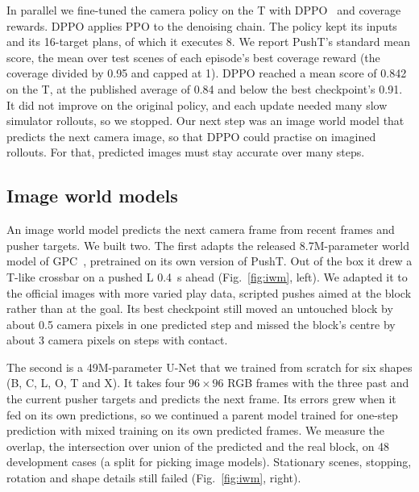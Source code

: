 \documentclass[10pt,twocolumn,letterpaper]{article}
\begin{document}
In parallel we fine-tuned the camera policy on the T with DPPO~\citep{ren2025dppo} and coverage rewards. DPPO applies
PPO to the denoising chain. The policy kept its inputs and its 16-target plans, of which it executes 8. We report
PushT's standard mean score, the mean over test scenes of each episode's best coverage reward (the coverage divided by
0.95 and capped at 1). DPPO reached a mean score of 0.842 on the T, at the published average of 0.84 and below the
best checkpoint's 0.91. It did not improve on the original policy, and each update needed many slow simulator rollouts,
so we stopped. Our next step was an image world model that predicts the next camera image, so that DPPO could practise
on imagined rollouts. For that, predicted images must stay accurate over many steps.

\subsection{Image world models}
\label{sec:iwm}

An image world model predicts the next camera frame from recent frames and pusher targets. We built two. The first
adapts the released 8.7M-parameter world model of GPC~\citep{qi2025gpc}, pretrained on its own version of PushT. Out
of the box it drew a T-like crossbar on a pushed L 0.4~s ahead (Fig.~\ref{fig:iwm}, left). We adapted it to the
official images with more varied play data, scripted pushes aimed at the block rather than at the goal. Its best
checkpoint still moved an untouched block by about 0.5 camera pixels in one predicted step and missed the block's
centre by about 3 camera pixels on steps with contact.

The second is a 49M-parameter U-Net that we trained from scratch for six shapes (B, C, L, O, T and X). It takes four
$96\times96$ RGB frames with the three past and the current pusher targets and predicts the next frame. Its errors grew
when it fed on its own predictions, so we continued a parent model trained for one-step prediction with mixed training
on its own predicted frames. We measure the overlap, the intersection over union of the predicted and the real block,
on 48 development cases (a split for picking image models). Stationary scenes, stopping, rotation and shape details
still failed (Fig.~\ref{fig:iwm}, right).
\end{document}
